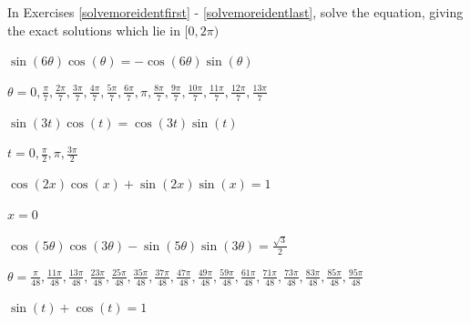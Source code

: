 \documentclass{ximera}
\begin{document}
\begin{question}
In Exercises \ref{solvemoreidentfirst} - \ref{solvemoreidentlast}, solve the equation, giving the exact solutions which lie in $[0, 2\pi)$

\begin{problem} \label{solvemoreidentfirst}
$\sin(6\theta) \cos(\theta) = -\cos(6\theta) \sin(\theta)$ 

\begin{solution}
$\theta = 0, \frac{\pi}{7}, \frac{2\pi}{7}, \frac{3\pi}{7}, \frac{4\pi}{7}, \frac{5\pi}{7}, \frac{6\pi}{7}, \pi, \frac{8\pi}{7}, \frac{9\pi}{7}, \frac{10\pi}{7}, \frac{11\pi}{7}, \frac{12\pi}{7}, \frac{13\pi}{7}$
\end{solution}
\end{problem}

\begin{problem}
$\sin(3t)\cos(t) = \cos(3t) \sin(t)$

\begin{solution}
$t=0, \frac{\pi}{2}, \pi, \frac{3\pi}{2}$
\end{solution}
\end{problem}

\begin{problem}
$\cos(2x)\cos(x) + \sin(2x)\sin(x) = 1$ 

\begin{solution}
$x = 0$
\end{solution}
\end{problem}

\begin{problem}
$\cos(5\theta)\cos(3\theta) - \sin(5\theta)\sin(3\theta) = \frac{\sqrt{3}}{2}$

\begin{solution}
$\theta = \frac{\pi}{48}, \frac{11\pi}{48}, \frac{13\pi}{48}, \frac{23\pi}{48}, \frac{25\pi}{48}, \frac{35\pi}{48}, \frac{37\pi}{48}, \frac{47\pi}{48}, \frac{49\pi}{48}, \frac{59\pi}{48}, \frac{61\pi}{48}, \frac{71\pi}{48}, \frac{73\pi}{48}, \frac{83\pi}{48}, \frac{85\pi}{48}, \frac{95\pi}{48}$
\end{solution}
\end{problem}

\begin{problem}
$\sin(t) + \cos(t) = 1$

\begin{selectAll}
  \end{selectAll}
\end{problem}


\end{question}
\end{document}

